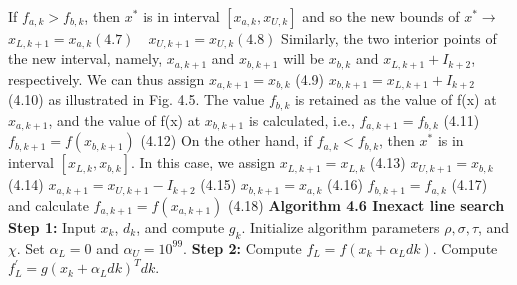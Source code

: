 \begin{multicols}{3}
If $f_{a,k} > f_{b,k}$, then $x^*$ is in interval $[x_{a,k}, x_{U,k}]$ and so the new bounds of $x^* \rightarrow$  %
$x_{L,k+1} = x_{a,k} (4.7) \quad x_{U,k+1} = x_{U,k} (4.8)$ 
Similarly, the two interior points of the new interval, namely, $x_{a,k+1}$ and $x_{b,k+1}$
will be $x_{b,k}$ and $x_{L,k+1} + I_{k+2}$, respectively. We can thus assign
$x_{a,k+1} = x_{b,k}$ (4.9) $x_{b,k+1} = x_{L,k+1} + I_{k+2}$ (4.10)
as illustrated in Fig. 4.5. \newline
The value $f_{b,k}$ is retained as the value of f(x) at
$x_{a,k+1}$, and the value of f(x) at $x_{b,k+1}$ is calculated, i.e.,
$f_{a,k+1} = f_{b,k}$ (4.11)
$f_{b,k+1} = f(x_{b,k+1})$ (4.12) \newline
On the other hand, if $f_{a,k} < f_{b,k}$, then $x^*$ is in interval $[x_{L,k}, x_{b,k}]$. In this
case, we assign
$x_{L,k+1} = x_{L,k}$ (4.13)
$x_{U,k+1} = x_{b,k}$ (4.14)
$x_{a,k+1} = x_{U,k+1} - I_{k+2}$ (4.15)
$x_{b,k+1} = x_{a,k}$ (4.16)
$f_{b,k+1} = f_{a,k}$ (4.17)
and calculate
$f_{a,k+1} = f(x_{a,k+1})$ (4.18) \newline  \newline
\textbf{Algorithm 4.6 Inexact line search}  \newline
\textbf{Step 1:} \newline
Input $x_k$, $d_k$, and compute $g_k$. \newline
Initialize algorithm parameters $\rho, \sigma, \tau$, and $\chi$. \newline
Set $\alpha_L = 0$ and $\alpha_U = 10^{99}$. \newline
\textbf{Step 2:} \newline
Compute $f_L = f(x_k + \alpha_L dk)$. \newline
Compute $f_L^\prime = g(x_k + \alpha_L dk)^Tdk$. \newline

\end{multicols}
